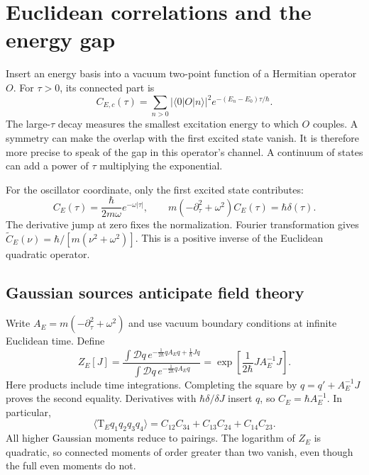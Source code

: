 \documentclass[11pt]{article}
\newcommand{\D}{\mathcal D}
\newcommand{\Tord}{\mathrm T}
\newcommand{\module}[1]{\clearpage\section{#1}}
\begin{document}
\module{Euclidean correlations and the energy gap}
Insert an energy basis into a vacuum two-point function of a Hermitian
operator \(O\). For \(\tau>0\), its connected part is
\begin{equation}
 C_{E,c}(\tau)=
 \sum_{n>0}|\langle0|O|n\rangle|^2
 e^{-(E_n-E_0)\tau/\hbar}.                           \label{eq:gap}
\end{equation}
The large-\(\tau\) decay measures the smallest excitation energy to
which \(O\) couples. A symmetry can make the overlap with the first
excited state vanish. It is therefore more precise to speak of the
gap in this operator's channel. A continuum of states can add a power
of \(\tau\) multiplying the exponential.

For the oscillator coordinate, only the first excited state contributes:
\begin{equation}
 C_E(\tau)=\frac{\hbar}{2m\omega}e^{-\omega|\tau|},\qquad
 m(-\partial_\tau^2+\omega^2)C_E(\tau)=\hbar\delta(\tau).
\end{equation}
The derivative jump at zero fixes the normalization. Fourier
transformation gives \(\widetilde C_E(\nu)=\hbar/[m(\nu^2+\omega^2)]\).
This is a positive inverse of the Euclidean quadratic operator.

\subsection{Gaussian sources anticipate field theory}
Write \(A_E=m(-\partial_\tau^2+\omega^2)\) and use vacuum boundary
conditions at infinite Euclidean time. Define
\begin{equation}
 Z_E[J]=\frac{\int\D q\,e^{-\frac1{2\hbar}qA_Eq+
                                    \frac1\hbar Jq}}
 {\int\D q\,e^{-\frac1{2\hbar}qA_Eq}}
 =\exp\!\left[\frac1{2\hbar}JA_E^{-1}J\right].
                                                        \label{eq:gaussiansource}
\end{equation}
Here products include time integrations. Completing the square by
\(q=q'+A_E^{-1}J\) proves the second equality. Derivatives with
\(\hbar\delta/\delta J\) insert \(q\), so
\(C_E=\hbar A_E^{-1}\). In particular,
\begin{equation}
 \langle\Tord_E q_1q_2q_3q_4\rangle
 =C_{12}C_{34}+C_{13}C_{24}+C_{14}C_{23}.
\end{equation}
All higher Gaussian moments reduce to pairings. The logarithm of
\(Z_E\) is quadratic, so connected moments of order greater than two
vanish, even though the full even moments do not.
\end{document}
